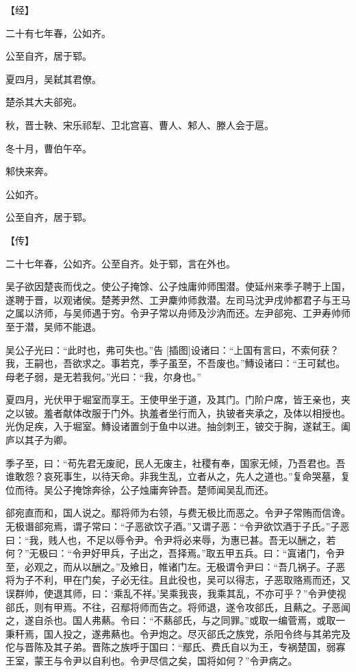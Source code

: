 \documentclass[a4paper,12pt,UTF8,twoside]{ctexbook}
\begin{document}
【经】

二十有七年春，公如齐。

公至自齐，居于郓。

夏四月，吴弑其君僚。

楚杀其大夫郤宛。

秋，晋士鞅、宋乐祁犁、卫北宫喜、曹人、邾人、滕人会于扈。

冬十月，曹伯午卒。

邾快来奔。

公如齐。

公至自齐，居于郓。

【传】

二十七年春，公如齐。公至自齐。处于郓，言在外也。

吴子欲因楚丧而伐之。使公子掩馀、公子烛庸帅师围潜。使延州来季子聘于上国，遂聘于晋，以观诸侯。楚莠尹然、工尹麇帅师救潜。左司马沈尹戌帅都君子与王马之属以济师，与吴师遇于穷。令尹子常以舟师及沙汭而还。左尹郤宛、工尹寿帅师至于潜，吴师不能退。

吴公子光曰：“此时也，弗可失也。”告 [插图]设诸曰：“上国有言曰，不索何获？我，王嗣也，吾欲求之。事若克，季子虽至，不吾废也。”鱄设诸曰：“王可弑也。母老子弱，是无若我何。”光曰：“我，尔身也。”

夏四月，光伏甲于堀室而享王。王使甲坐于道，及其门。门阶户席，皆王亲也，夹之以铍。羞者献体改服于门外。执羞者坐行而入，执铍者夹承之，及体以相授也。光伪足疾，入于堀室。鱄设诸置剑于鱼中以进。抽剑刺王，铍交于胸，遂弑王。阖庐以其子为卿。

季子至，曰：“苟先君无废祀，民人无废主，社稷有奉，国家无倾，乃吾君也。吾谁敢怨？哀死事生，以待天命。非我生乱，立者从之，先人之道也。”复命哭墓，复位而待。吴公子掩馀奔徐，公子烛庸奔钟吾。楚师闻吴乱而还。

郤宛直而和，国人说之。鄢将师为右领，与费无极比而恶之。令尹子常贿而信谗。无极谮郤宛焉，谓子常曰：“子恶欲饮子酒。”又谓子恶：“令尹欲饮酒于子氏。”子恶曰：“我，贱人也，不足以辱令尹。令尹将必来辱，为惠已甚。吾无以酬之，若何？”无极曰：“令尹好甲兵，子出之，吾择焉。”取五甲五兵。曰：“寘诸门，令尹至，必观之，而从以酬之。”及飨日，帷诸门左。无极谓令尹曰：“吾几祸子。子恶将为子不利，甲在门矣，子必无往。且此役也，吴可以得志，子恶取赂焉而还，又误群帅，使退其师，曰：‘乘乱不祥。’吴乘我丧，我乘其乱，不亦可乎？”令尹使视郤氏，则有甲焉。不往，召鄢将师而告之。将师退，遂令攻郤氏，且爇之。子恶闻之，遂自杀也。国人弗爇。令曰：“不爇郤氏，与之同罪。”或取一编菅焉，或取一秉秆焉，国人投之，遂弗爇也。令尹炮之。尽灭郤氏之族党，杀阳令终与其弟完及佗与晋陈及其子弟。晋陈之族呼于国曰：“鄢氏、费氏自以为王，专祸楚国，弱寡王室，蒙王与令尹以自利也。令尹尽信之矣，国将如何？”令尹病之。
\end{document}
